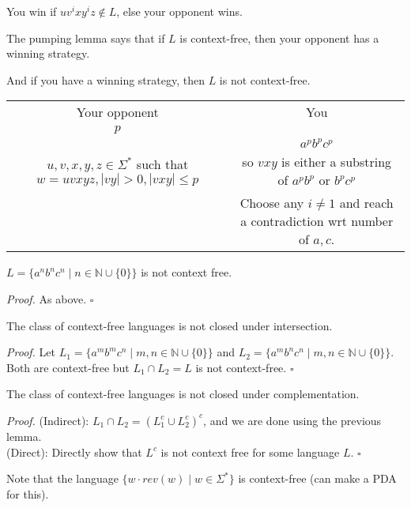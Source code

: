 \documentclass[a4paper]{article}
\newenvironment{proof}{\begin{breakbox}\textit{Proof.}}{\hfill$\square$\end{breakbox}}
\newcommand{\nl}{\vspace{0.2cm}\\}
\newcommand{\mb}{\mathbb}
\begin{document}
You win if $uv^ixy^iz \not\in L$, else your opponent wins.

The pumping lemma says that if $L$ is context-free, then your opponent has a winning strategy.

And if you have a winning strategy, then $L$ is not context-free.

\begin{eg}
\begin{tabular}{|c|c|}
    Your opponent & You \\
    $p$ &  \\
     & $a^pb^pc^p$ \\
    $u, v, x, y, z \in \Sigma^*$ such that $w = uvxyz, |vy| > 0, |vxy| \le p$ & so $vxy$ is either a substring of $a^pb^p$ or $b^pc^p$ \\
     & Choose any $i \ne 1$ and reach a contradiction wrt number of $a, c$. \\
\end{tabular}
\end{eg}

\begin{claim}
    $L = \{a^nb^nc^n \mid n \in \mb{N} \cup \{0\}\}$ is not context free.
\end{claim}

\begin{proof}
    As above.
\end{proof}

\begin{cor}
    The class of context-free languages is not closed under intersection.
\end{cor}

\begin{proof}
    Let $L_1 = \{a^mb^mc^n \mid m, n \in \mb{N} \cup \{0\}\}$ and $L_2 = \{a^mb^nc^n \mid m, n \in \mb{N} \cup \{0\}\}$. Both are context-free but $L_1 \cap L_2 = L$ is not context-free.
\end{proof}

\begin{cor}
    The class of context-free languages is not closed under complementation.
\end{cor}

\begin{proof}
    (Indirect): $L_1 \cap L_2 = (L_1^c \cup L_2^c)^c$, and we are done using the previous lemma.\nl
    (Direct): Directly show that $L^c$ is not context free for some language $L$.
\end{proof}

\begin{note}
    Note that the language $\{w \cdot rev(w) \mid w \in \Sigma^*\}$ is context-free (can make a PDA for this).
\end{note}
\end{document}
